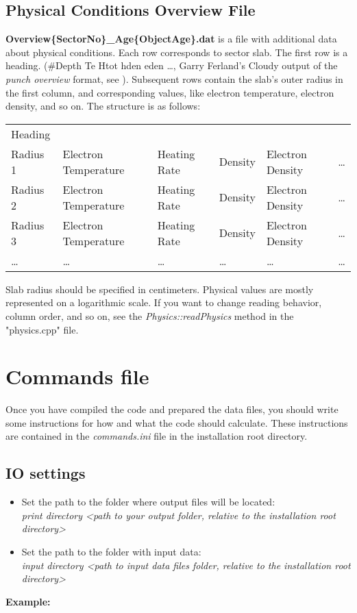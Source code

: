\documentclass[a4paper]{article}
\begin{document}
\subsection{Physical Conditions Overview File}
\label{dataOverview}
{\bf Overview\{SectorNo\}\_Age\{ObjectAge\}.dat} is a file with additional data about physical conditions. Each row
corresponds to sector slab. The first row is a heading.
(\#Depth Te Htot hden eden \ldots, Garry Ferland's Cloudy output of the {\it punch overview}
format, see \cite{Cloudy}). Subsequent rows contain the slab's outer radius in the first column,
and corresponding values, like electron temperature, electron density, and so on. The structure is as follows:
\begin{table}[H]
    \begin{tabular}{llllll}
        Heading & & & & & \\
        Radius 1 & Electron Temperature & Heating Rate & Density & Electron Density & \ldots \\
        Radius 2 & Electron Temperature & Heating Rate & Density & Electron Density & \ldots \\
        Radius 3 & Electron Temperature & Heating Rate & Density & Electron Density & \ldots \\
        \ldots & \ldots & \ldots & \ldots & \ldots & \ldots \\
    \end{tabular}
\end{table}
Slab radius should be specified in centimeters. Physical values are mostly represented on a logarithmic scale. If you want to change reading behavior, column order, and so on, see the {\it Physics::readPhysics} method in the "physics.cpp" file.

\section{Commands file}

Once you have compiled the code and prepared the data files, you should write some instructions for how and what the code should calculate. These instructions are contained in the {\it commands.ini} file in the installation root directory.

\subsection{IO settings}
\begin{itemize}
    \item Set the path to the folder where output files will be located: \\
    \hspace*{0.25cm} {\it print directory <path to your output folder, relative to the installation root directory>}
    \item Set the path to the folder with input data: \\
    \hspace*{0.25cm} {\it input directory <path to input data files folder, relative to the installation root directory>}
\end{itemize}
{\bf Example:}
\vspace{0.25cm}
\end{document}
